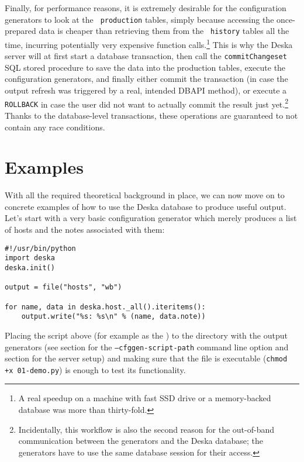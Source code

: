 \documentclass[deska]{subfiles}
\begin{document}
Finally, for performance reasons, it is extremely desirable for the configuration generators to look at the {\tt
production} tables, simply because accessing the once-prepared data is cheaper than retrieving them from the {\tt
history} tables all the time, incurring potentially very expensive function calls.\footnote{A real speedup on a machine
with fast SSD drive or a memory-backed database was more than thirty-fold.}  This is why the Deska server will at
first start a database transaction, then call the {\tt commitChangeset} SQL stored procedure to save the data into the
production tables, execute the configuration generators, and finally either commit the transaction (in case the
output refresh was triggered by a real, intended  DBAPI method), or execute a {\tt
ROLLBACK} in case the user did not want to actually commit the result just yet.\footnote{Incidentally, this workflow is
also the second reason for the out-of-band communication between the generators and the Deska database; the generators
have to use the same database session for their access.} Thanks to the database-level transactions, these operations are
guaranteed to not contain any race conditions.

\section{Examples}

With all the required theoretical background in place, we can now move on to concrete examples of how to use the Deska
database to produce useful output.  Let's start with a very basic configuration generator which merely produces a list
of hosts and the notes associated with them:

\begin{verbatim}
#!/usr/bin/python
import deska
deska.init()

output = file("hosts", "wb")

for name, data in deska.host._all().iteritems():
    output.write("%s: %s\n" % (name, data.note))
\end{verbatim}

Placing the script above (for example as the ) to the directory with the output generators (see section
 for the {\tt --cfggen-script-path} command line option and section
 for the server setup) and making sure that the file is executable ({\tt chmod +x
01-demo.py}) is enough to test its functionality.
\end{document}
